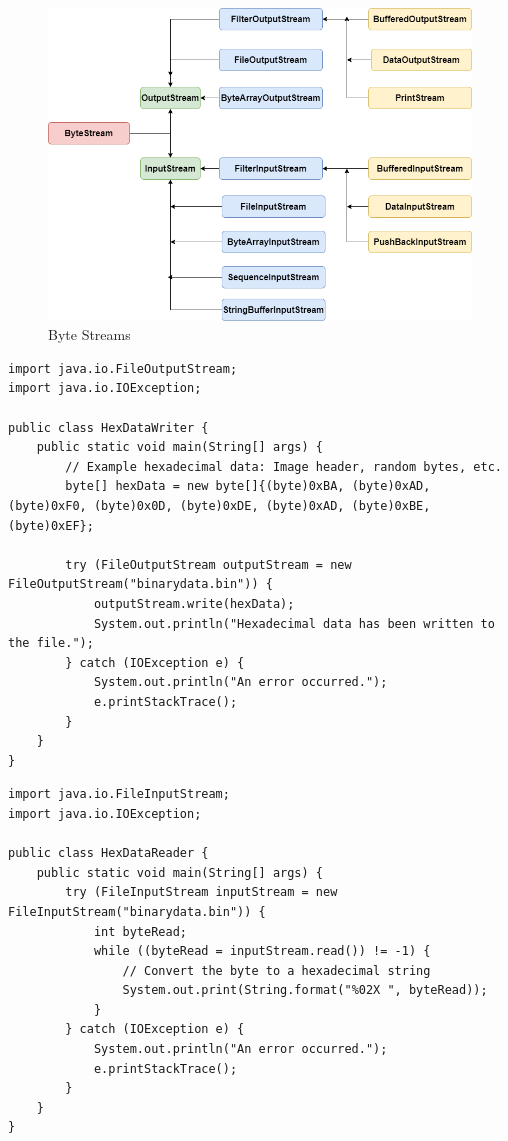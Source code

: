 \begin{figure}[H]
  \includegraphics[width=\linewidth]{images/file_io/byte_stream_classes.png}
  \caption{Byte Streams}
  \label{fig:paths}
\end{figure}


\begin{lstlisting}
import java.io.FileOutputStream;
import java.io.IOException;

public class HexDataWriter {
    public static void main(String[] args) {
        // Example hexadecimal data: Image header, random bytes, etc.
        byte[] hexData = new byte[]{(byte)0xBA, (byte)0xAD, (byte)0xF0, (byte)0x0D, (byte)0xDE, (byte)0xAD, (byte)0xBE, (byte)0xEF};

        try (FileOutputStream outputStream = new FileOutputStream("binarydata.bin")) {
            outputStream.write(hexData);
            System.out.println("Hexadecimal data has been written to the file.");
        } catch (IOException e) {
            System.out.println("An error occurred.");
            e.printStackTrace();
        }
    }
}
\end{lstlisting}


\begin{lstlisting}
import java.io.FileInputStream;
import java.io.IOException;

public class HexDataReader {
    public static void main(String[] args) {
        try (FileInputStream inputStream = new FileInputStream("binarydata.bin")) {
            int byteRead;
            while ((byteRead = inputStream.read()) != -1) {
                // Convert the byte to a hexadecimal string
                System.out.print(String.format("%02X ", byteRead));
            }
        } catch (IOException e) {
            System.out.println("An error occurred.");
            e.printStackTrace();
        }
    }
}
\end{lstlisting}


